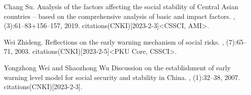 \documentclass[12pt]{article}  %
\begin{document}
\begin{thebibliography}{100}
Chang Su.
\newblock
 Analysis of the factors affecting the social stability of Central Asian countries -- based on the comprehensive analysis of basic and impact factors.
, (3):61--83+156--157, 2019.
 citations(CNKI)[2023-2-3]{\textless}CSSCI, AMI{\textgreater}.



Wei Zhideng.
\newblock Reflections on the early warning mechanism of social risks.
, (7):65--71, 2003.
 citations(CNKI)[2023-2-5]{\textless}PKU Core,
  CSSCI{\textgreater}.


Yongzhong Wei and Shaozhong Wu
\newblock Discussion on the establishment of early warning level model for social security and stability in China.
, (1):32--38, 2007.
 citations(CNKI)[2023-2-3].

\end{thebibliography}





\end{document}
